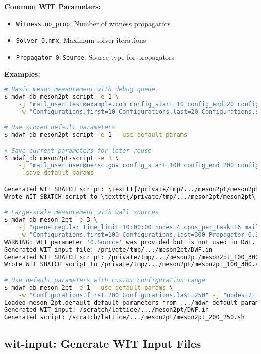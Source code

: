 \documentclass{article}
\begin{document}
\textbf{Common WIT Parameters:}
\begin{itemize}
\item \texttt{Witness.no\_prop}: Number of witness propagators
\item \texttt{Solver 0.nmx}: Maximum solver iterations
\item \texttt{Propagator 0.Source}: Source type for propagators
\end{itemize}

\textbf{Examples:}
\begin{lstlisting}[language=bash]
# Basic meson measurement with debug queue
$ mdwf_db meson2pt-script -e 1 \
    -j "mail_user=test@example.com config_start=10 config_end=20 config_inc=2" \
    -w "Configurations.first=10 Configurations.last=20 Configurations.step=2"

# Use stored default parameters
$ mdwf_db meson2pt-script -e 1 --use-default-params

# Save current parameters for later reuse
$ mdwf_db meson2pt-script -e 1 \
    -j "mail_user=user@nersc.gov config_start=100 config_end=200 config_inc=4" \
    --save-default-params

Generated WIT SBATCH script: \texttt{/private/tmp/.../meson2pt/meson2pt\_10\_20.sh}
Wrote WIT SBATCH script to \texttt{/private/tmp/.../meson2pt/meson2pt\_10\_20.sh}

# Large-scale measurement with wall sources
$ mdwf_db meson-2pt -e 3 \
    -j "queue=regular time_limit=10:00:00 nodes=4 cpus_per_task=16 mail_user=hpc@university.edu" \
    -w "Configurations.first=100 Configurations.last=300 Propagator 0.Source=Wall"
WARNING: WIT parameter '0.Source' was provided but is not used in DWF.in
Generated WIT input file: /private/tmp/.../meson2pt/DWF.in
Generated WIT SBATCH script: /private/tmp/.../meson2pt/meson2pt_100_300.sh
Wrote WIT SBATCH script to /private/tmp/.../meson2pt/meson2pt_100_300.sh

# Use default parameters with custom configuration range
$ mdwf_db meson-2pt -e 1 --use-default-params \
    -w "Configurations.first=200 Configurations.last=250" -j "nodes=2"
Loaded meson_2pt.default default parameters from .../mdwf_default_params.yaml
Generated WIT input: /scratch/lattice/.../meson2pt/DWF.in
Generated script: /scratch/lattice/.../meson2pt/meson2pt_200_250.sh
\end{lstlisting}

\subsection{wit-input: Generate WIT Input Files}
\end{document}
